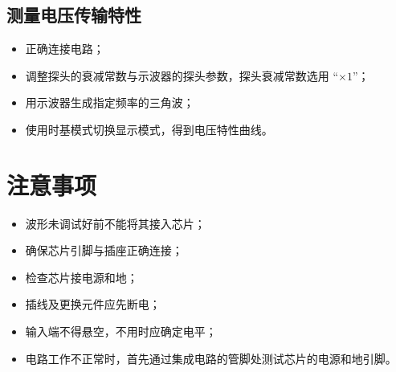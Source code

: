 \documentclass[a4paper]{article}
\begin{document}
    \subsection{测量电压传输特性}

        \begin{itemize}
            \item 正确连接电路；
            \item 调整探头的衰减常数与示波器的探头参数，探头衰减常数选用 “$\times 1$”；
            \item 用示波器生成指定频率的三角波；
            \item 使用时基模式切换显示模式，得到电压特性曲线。
        \end{itemize}

\section{注意事项}

    \begin{itemize}
        \item 波形未调试好前不能将其接入芯片；
        \item 确保芯片引脚与插座正确连接；
        \item 检查芯片接电源和地；
        \item 插线及更换元件应先断电；
        \item 输入端不得悬空，不用时应确定电平；
        \item 电路工作不正常时，首先通过集成电路的管脚处测试芯片的电源和地引脚。
    \end{itemize}
\end{document}
